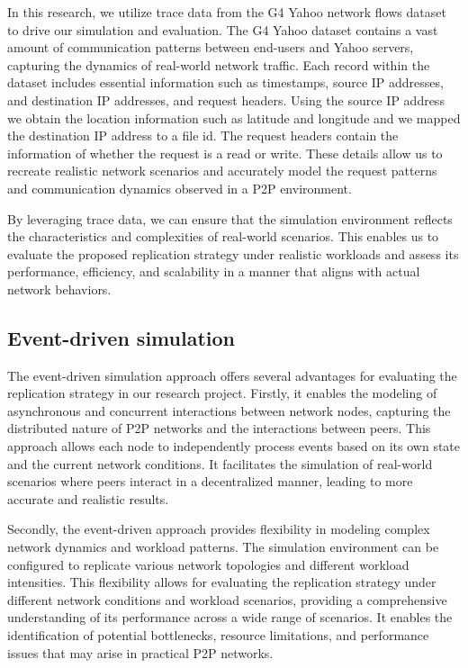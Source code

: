 \documentclass[10pt, conference]{IEEEtran}
\begin{document}
In this research, we utilize trace data from the G4 Yahoo network flows dataset to drive our simulation and evaluation. The G4 Yahoo dataset contains a vast amount of communication patterns between end-users and Yahoo servers, capturing the dynamics of real-world network traffic. Each record within the dataset includes essential information such as timestamps, source IP addresses, and destination IP addresses, and request headers. Using the source IP address we obtain the location information such as latitude and longitude and we mapped the destination IP address to a file id. The request headers contain the information of whether the request is a read or write. These details allow us to recreate realistic network scenarios and accurately model the request patterns and communication dynamics observed in a P2P environment. 

By leveraging trace data, we can ensure that the simulation environment reflects the characteristics and complexities of real-world scenarios. This enables us to evaluate the proposed replication strategy under realistic workloads and assess its performance, efficiency, and scalability in a manner that aligns with actual network behaviors. 
\subsection{Event-driven simulation}
The event-driven simulation approach offers several advantages for evaluating the replication strategy in our research project. Firstly, it enables the modeling of asynchronous and concurrent interactions between network nodes, capturing the distributed nature of P2P networks and the interactions between peers. This approach allows each node to independently process events based on its own state and the current network conditions. It facilitates the simulation of real-world scenarios where peers interact in a decentralized manner, leading to more accurate and realistic results.

Secondly, the event-driven approach provides flexibility in modeling complex network dynamics and workload patterns. The simulation environment can be configured to replicate various network topologies and different workload intensities. This flexibility allows for evaluating the replication strategy under different network conditions and workload scenarios, providing a comprehensive understanding of its performance across a wide range of scenarios. It enables the identification of potential bottlenecks, resource limitations, and performance issues that may arise in practical P2P networks.
\end{document}

